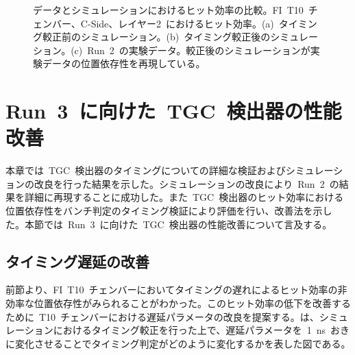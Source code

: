 \begin{figure}[H]
\begin{minipage}{0.99\hsize}
	\subcaption{}
	\end{minipage}
	\caption[データとシミュレーションにおけるヒット効率の比較]{データとシミュレーションにおけるヒット効率の比較。FI~T10~チェンバー、C-Side、レイヤー2~におけるヒット効率。(a)~タイミング較正前のシミュレーション。(b)~タイミング較正後のシミュレーション。(c)~Run~2~の実験データ。較正後のシミュレーションが実験データの位置依存性を再現している。}
	\label{fig:hiteff}
\end{figure}

\section{Run~3~に向けた~TGC~検出器の性能改善}
本章では~TGC~検出器のタイミングについての詳細な検証およびシミュレーションの改良を行った結果を示した。シミュレーションの改良により~Run~2~の結果を詳細に再現することに成功した。また~TGC~検出器のヒット効率における位置依存性をバンチ判定のタイミング検証により評価を行い、改善法を示した。本節では~Run~3~に向けた~TGC~検出器の性能改善について言及する。

\subsection{タイミング遅延の改善}
前節より、FI~T10~チェンバーにおいてタイミングの遅れによるヒット効率の非効率な位置依存性がみられることがわかった。このヒット効率の低下を改善するために~T10~チェンバーにおける遅延パラメータの改良を提案する。は、シミュレーションにおけるタイミング較正を行った上で、遅延パラメータを~1~ns~おきに変化させることでタイミング判定がどのように変化するかを表した図である。

